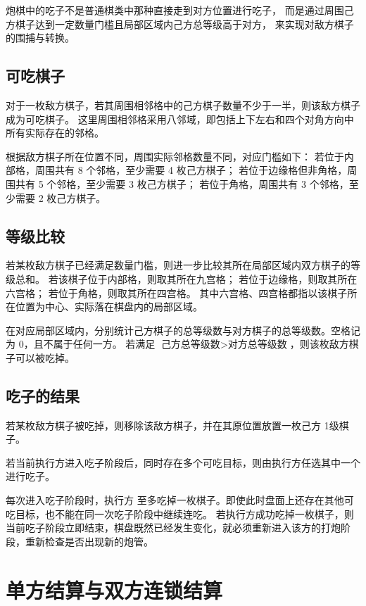\documentclass[12pt]{ctexart}
\begin{document}
炮棋中的吃子不是普通棋类中那种直接走到对方位置进行吃子，
而是通过周围己方棋子达到一定数量门槛且局部区域内己方总等级高于对方，
来实现对敌方棋子的围捕与转换。

\subsection{可吃棋子}

对于一枚敌方棋子，若其周围相邻格中的己方棋子数量不少于一半，则该敌方棋子成为可吃棋子。
这里周围相邻格采用八邻域，即包括上下左右和四个对角方向中所有实际存在的邻格。

根据敌方棋子所在位置不同，周围实际邻格数量不同，对应门槛如下：
若位于内部格，周围共有 8 个邻格，至少需要 4 枚己方棋子；
若位于边缘格但非角格，周围共有 5 个邻格，至少需要 3 枚己方棋子；
若位于角格，周围共有 3 个邻格，至少需要 2 枚己方棋子。

\subsection{等级比较}

若某枚敌方棋子已经满足数量门槛，则进一步比较其所在局部区域内双方棋子的等级总和。
若该棋子位于内部格，则取其所在九宫格；
若位于边缘格，则取其所在六宫格；
若位于角格，则取其所在四宫格。
其中六宫格、四宫格都指以该棋子所在位置为中心、实际落在棋盘内的局部区域。

在对应局部区域内，分别统计己方棋子的总等级数与对方棋子的总等级数。空格记为 0，且不属于任何一方。
若满足 $\text{己方总等级数}>\text{对方总等级数}$，则该枚敌方棋子可以被吃掉。

\subsection{吃子的结果}

若某枚敌方棋子被吃掉，则移除该敌方棋子，并在其原位置放置一枚己方 1级棋子。

若当前执行方进入吃子阶段后，同时存在多个可吃目标，则由执行方任选其中一个进行吃子。

每次进入吃子阶段时，执行方 至多吃掉一枚棋子。即使此时盘面上还存在其他可吃目标，也不能在同一次吃子阶段中继续连吃。
若执行方成功吃掉一枚棋子，则当前吃子阶段立即结束，棋盘既然已经发生变化，就必须重新进入该方的打炮阶段，重新检查是否出现新的炮管。

\section{单方结算与双方连锁结算}
\end{document}
